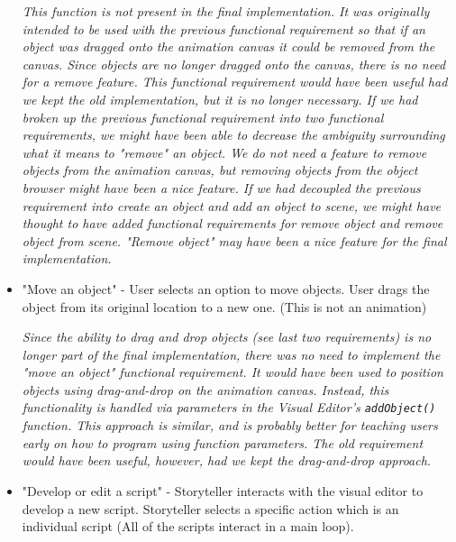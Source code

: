 \documentclass[12pt]{article}
\begin{document}
\begin{itemize}
\textit{This function is not present in the final implementation. It was originally intended to be used with the previous functional requirement so that if an object was dragged onto the animation canvas it could be removed from the canvas. Since objects are no longer dragged onto the canvas, there is no need for a remove feature. This functional requirement would have been useful had we kept the old implementation, but it is no longer necessary. If we had broken up the previous functional requirement into two functional requirements, we might have been able to decrease the ambiguity surrounding what it means to "remove" an object. We do not need a feature to remove objects from the animation canvas, but removing objects from the object browser might have been a nice feature. If we had decoupled the previous requirement into create an object and add an object to scene, we might have thought to have added functional requirements for remove object and remove object from scene. "Remove object" may have been a nice feature for the final implementation.}

\item "Move an object" - User selects an option to move objects. User drags the object from its original location to a new one. (This is not an animation)\ 

\textit{Since the ability to drag and drop objects (see last two requirements) is no longer part of the final implementation, there was no need to implement the "move an object" functional requirement. It would have been used to position objects using drag-and-drop on the animation canvas. Instead, this functionality is handled via parameters in the Visual Editor's \texttt{addObject()} function. This approach is similar, and is probably better for teaching users early on how to program using function parameters. The old requirement would have been useful, however, had we kept the drag-and-drop approach.}

\item "Develop or edit a script" - Storyteller interacts with the visual editor to develop a new script. Storyteller selects a specific action which is an individual script (All of the scripts interact in a main loop).\


\end{itemize}
\end{document}
